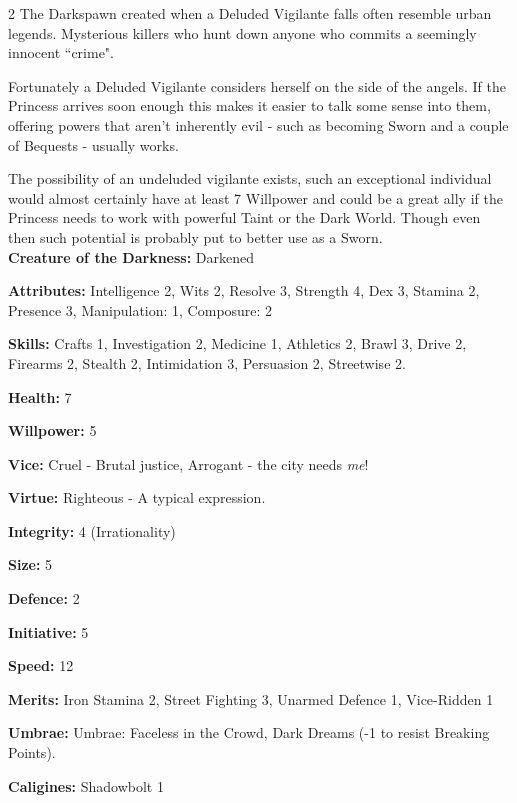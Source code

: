 \begin{multicols}{2}
The Darkspawn created when a Deluded Vigilante falls often resemble urban legends. Mysterious killers who hunt down anyone who commits a seemingly innocent \textquotedblleft crime".

Fortunately a Deluded Vigilante considers herself on the side of the angels. If the Princess arrives soon enough this makes it easier to talk some sense into them, offering powers that aren't inherently evil - such as becoming Sworn and a couple of Bequests - usually works.

The possibility of an undeluded vigilante exists, such an exceptional individual would almost certainly have at least 7 Willpower and could be a great ally if the Princess needs to work with powerful Taint or the Dark World. Though even then such potential is probably put to better use as a Sworn. \\

\noindent \textbf{Creature of the Darkness:} Darkened 

\noindent \textbf{Attributes:} Intelligence 2, Wits 2, Resolve 3, Strength 4, Dex 3, Stamina 2, Presence 3, Manipulation: 1, Composure: 2

\noindent \textbf{Skills:} Crafts 1, Investigation 2, Medicine 1, Athletics 2, Brawl 3, Drive 2, Firearms 2, Stealth 2, Intimidation 3, Persuasion 2, Streetwise 2.

\noindent \textbf{Health:} 7

\noindent \textbf{Willpower:} 5

\noindent \textbf{Vice:} Cruel - Brutal justice, Arrogant - the city needs \textit{me}!

\noindent \textbf{Virtue:} Righteous - A typical expression.

\noindent \textbf{Integrity:} 4 (Irrationality)

\noindent \textbf{Size:} 5

\noindent \textbf{Defence:} 2

\noindent \textbf{Initiative:} 5

\noindent \textbf{Speed:} 12

\noindent \textbf{Merits:} Iron Stamina 2, Street Fighting 3, Unarmed Defence 1, Vice-Ridden 1

\noindent \textbf{Umbrae:} Umbrae: Faceless in the Crowd, Dark Dreams (-1 to resist Breaking Points).

\noindent \textbf{Caligines:} Shadowbolt 1 


\end{multicols}
